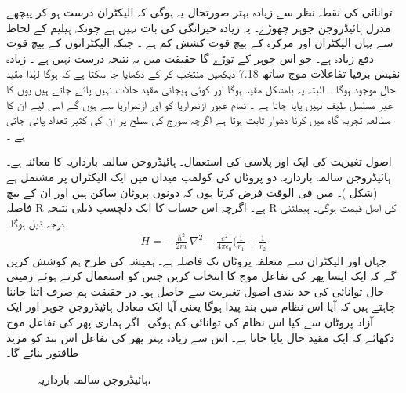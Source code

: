 توانائی کی نقطہ نظر سے زیادہ بہتر صورتحال یہ ہوگی کہ الیکٹران درست ہو کر پیچھے مدرل ہائیڈروجن جوہر چھوڑے۔ یہ زیادہ حیرانگی کی بات نہیں ہے چونکہ ہیلیم کے لحاظ سے یہاں الیکٹران اور مرکزہ کے بیچ قوت کشش کم ہے ۔ جبکہ الیکٹرانوں کے بیچ قوت دفع زیادہ ہے۔
جو اس جوہر کے توڑے گا حقیقت میں یہ نتیجہ درست نہیں ہے ۔ زیادہ نفیس برقیا تفاعلات موج ساتھ 
7.18
دیکھیں 
منتخب کر کے دکھایا جا سکتا ہے کہ   ہوگا لہٰذا مقید حال موجود ہوگا ۔
البتہ یہ بامشکل مقید ہوگا اور کوئی ہیجانی مقید حالات نہیں پائے جاتے ہیں یوں   کا غیر مسلسل طیف نہیں پایا جاتا ہے ۔
تمام عبور ازتمراریا کو اور ازتمراریا سے ہوں گے اسی لیے ان کا مطالعہ تجربہ گاہ میں کرنا دشوار ثابت ہوتا ہے اگرچہ سورج کی سطح پر ان کی کثیر تعداد پائی جاتی ہے ۔

 اصول تغیریت کی ایک اور پلاسی کی استعمال۔ ہائیڈروجن سالمہ بارداریہ   کا معائنہ ہے۔ ہائیڈروجن سالمہ بارداریہ دو پروٹان کی کولمب میدان میں ایک الیکٹران پر مشتمل ہے (شکل )۔ 
میں فی الوقت فرض کرتا ہوں کہ دونوں پروٹان ساکن ہیں اور ان کے بیچ فاصلہ R ہے۔ اگرچہ اس حساب کا ایک دلچسپ ذیلی نتیجہ R کی اصل قیمت ہوگی۔ ہیملٹنی درجہ ذیل ہوگا۔
 \begin{align}
H=-\frac{\hslash^{2}}{2m}\nabla^{2}-\frac{e^{2}}{4\pi\epsilon_{0}}(\frac{1}{r_{1}}+\frac{1}{r_{2}} 
\end{align}
 جہاں  اور   الیکٹران سے متعلقہ پروٹان تک فاصلہ ہے۔ ہمیشہ کی طرح ہم کوشش کریں گے کہ ایک ایسا پھر کی تفاعل موج کا انتخاب کریں جس کو استعمال کرتے ہوئے زمینی حال توانائی کی حد بندی اصول تغیریت سے حاصل ہو۔ در حقیقت ہم صرف اتنا جاننا چاہتے ہیں کہ آیا اس نظام میں بند پیدا ہوگا یعنی آیا ایک معادل ہائیڈروجن جوہر اور ایک آزاد پروٹان سے کیا اس نظام کی توانائی کم ہوگی۔ اگر ہماری پھر کی تفاعل موج دکھائے کہ ایک مقید حال پایا جاتا ہے۔ اس سے زیادہ بہتر پھر کی تفاعل اس بند کو مزید طاقتور بنائے گا۔
\begin{figure} \centering
{} 
\caption{ہائیڈروجن سالمہ بارداریہ، } 
\label{شکل_تغیریت_ہائیڈروجن_سالمہ_بارداریہ} 
\end{figure} 

